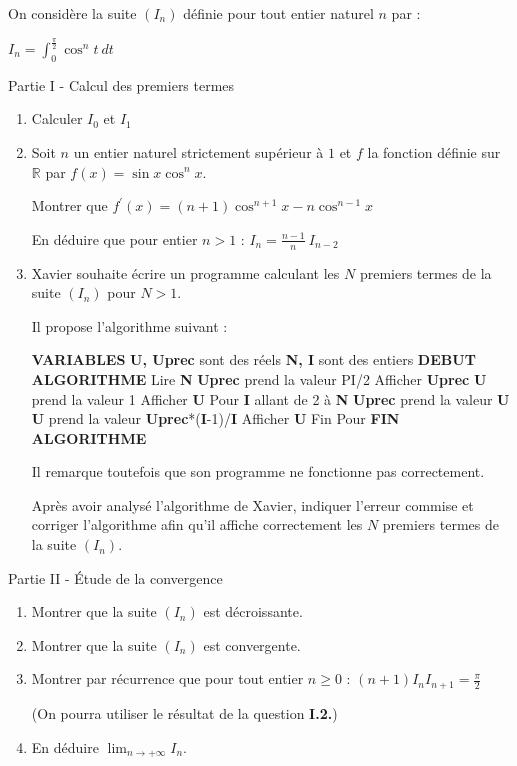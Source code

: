 
%
On considère la suite $(I_n)$ définie pour tout entier naturel $n$ par :
\par
$I_n= \int_0^{ \frac{ \pi } {2}}\cos^nt\ dt $
\begin{h3}Partie I - Calcul des premiers termes\end{h3}
\begin{enumerate}
     \item
     Calculer $I_0$ et $I_1$
     \item
     Soit $n$ un entier naturel strictement supérieur à $1$ et $f$ la fonction définie sur $\mathbb{R}$ par $f(x)=\sin x\cos^{n}x$.
     \par
     Montrer que $f^{\prime}(x)=(n+1)\cos^{n+1} x-n\cos^{n-1}x$
     \par
     En déduire que pour entier $n > 1$ : $I_n= \frac{n-1}{n}\ I_{n-2} $
     \item
     Xavier souhaite écrire un programme calculant les $N$ premiers termes de la suite $(I_n)$ pour $N > 1$.
     \par
     Il propose l'algorithme suivant :
\begin{code}
  \textbf{VARIABLES}
        \textbf{U, Uprec} sont des réels
        \textbf{N, I} sont des entiers
     \textbf{DEBUT ALGORITHME}
        Lire \textbf{N}
        \textbf{Uprec} prend la valeur PI/2
        Afficher \textbf{Uprec}
        \textbf{U} prend la valeur 1
        Afficher \textbf{U}
        Pour \textbf{I} allant de 2 à \textbf{N}
           \textbf{Uprec} prend la valeur \textbf{U}
           \textbf{U} prend la valeur \textbf{Uprec}*(\textbf{I}-1)/\textbf{I}
           Afficher \textbf{U}
        Fin Pour
     \textbf{FIN ALGORITHME}
\end{code}



Il remarque toutefois que son programme ne fonctionne pas correctement.
\par
Après avoir analysé l'algorithme de Xavier, indiquer l'erreur commise et corriger l'algorithme afin qu'il affiche correctement les $N$ premiers termes de la suite $(I_n)$.
\end{enumerate}
\begin{h3}Partie II - Étude de la convergence\end{h3}
\begin{enumerate}
     \item
     Montrer que la suite $(I_n)$ est décroissante.
     \item
     Montrer que la suite $(I_n)$ est convergente.
     \item
     Montrer par récurrence que pour tout entier $n  \geqslant 0$ : $\left(n+1\right)I_nI_{n+1}= \frac{ \pi }{2} $
     \par
     (On pourra utiliser le résultat de la question \textbf{I.2.})
     \item
     En déduire $ \lim_{n \rightarrow  +\infty  }  I_n$.
\end{enumerate}
